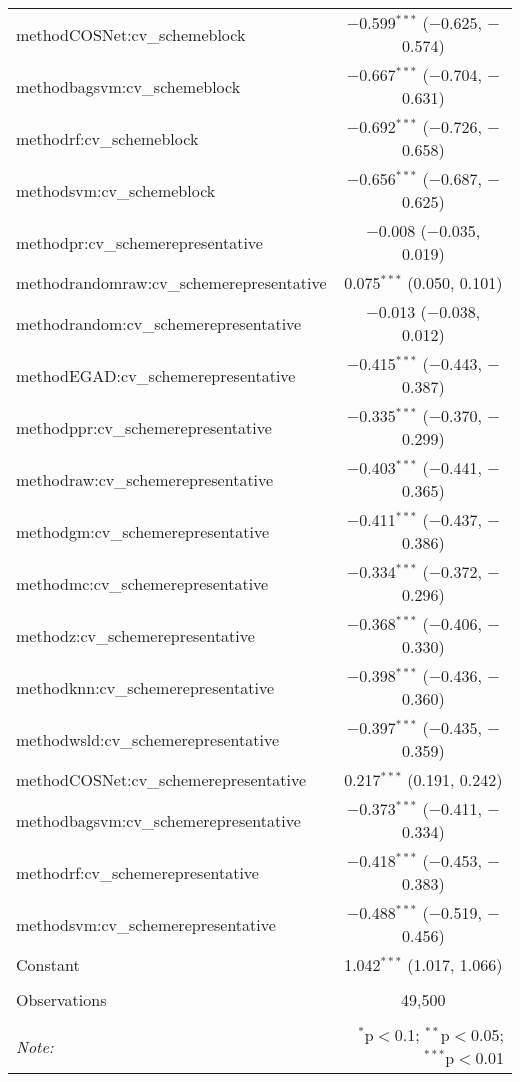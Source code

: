 \begin{table}[!htbp]
\begin{tabular}{@{\extracolsep{5pt}}lc}
  methodCOSNet:cv\_schemeblock & $-$0.599$^{***}$ ($-$0.625, $-$0.574) \\ 
  methodbagsvm:cv\_schemeblock & $-$0.667$^{***}$ ($-$0.704, $-$0.631) \\ 
  methodrf:cv\_schemeblock & $-$0.692$^{***}$ ($-$0.726, $-$0.658) \\ 
  methodsvm:cv\_schemeblock & $-$0.656$^{***}$ ($-$0.687, $-$0.625) \\ 
  methodpr:cv\_schemerepresentative & $-$0.008 ($-$0.035, 0.019) \\ 
  methodrandomraw:cv\_schemerepresentative & 0.075$^{***}$ (0.050, 0.101) \\ 
  methodrandom:cv\_schemerepresentative & $-$0.013 ($-$0.038, 0.012) \\ 
  methodEGAD:cv\_schemerepresentative & $-$0.415$^{***}$ ($-$0.443, $-$0.387) \\ 
  methodppr:cv\_schemerepresentative & $-$0.335$^{***}$ ($-$0.370, $-$0.299) \\ 
  methodraw:cv\_schemerepresentative & $-$0.403$^{***}$ ($-$0.441, $-$0.365) \\ 
  methodgm:cv\_schemerepresentative & $-$0.411$^{***}$ ($-$0.437, $-$0.386) \\ 
  methodmc:cv\_schemerepresentative & $-$0.334$^{***}$ ($-$0.372, $-$0.296) \\ 
  methodz:cv\_schemerepresentative & $-$0.368$^{***}$ ($-$0.406, $-$0.330) \\ 
  methodknn:cv\_schemerepresentative & $-$0.398$^{***}$ ($-$0.436, $-$0.360) \\ 
  methodwsld:cv\_schemerepresentative & $-$0.397$^{***}$ ($-$0.435, $-$0.359) \\ 
  methodCOSNet:cv\_schemerepresentative & 0.217$^{***}$ (0.191, 0.242) \\ 
  methodbagsvm:cv\_schemerepresentative & $-$0.373$^{***}$ ($-$0.411, $-$0.334) \\ 
  methodrf:cv\_schemerepresentative & $-$0.418$^{***}$ ($-$0.453, $-$0.383) \\ 
  methodsvm:cv\_schemerepresentative & $-$0.488$^{***}$ ($-$0.519, $-$0.456) \\ 
  Constant & 1.042$^{***}$ (1.017, 1.066) \\ 
 \hline \\[-1.8ex] 
Observations & 49,500 \\ 
\hline 
\hline \\[-1.8ex] 
\textit{Note:}  & \multicolumn{1}{r}{$^{*}$p$<$0.1; $^{**}$p$<$0.05; $^{***}$p$<$0.01} \\ 
\end{tabular} 
\end{table} 
